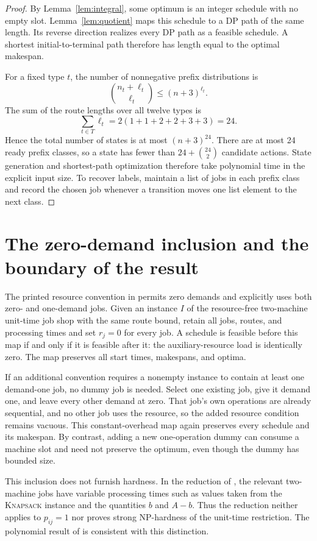 \documentclass[11pt]{article}
\begin{document}
\begin{proof}
By Lemma~\ref{lem:integral}, some optimum is an integer schedule with no
empty slot.  Lemma~\ref{lem:quotient} maps this schedule to a DP path of the
same length.  Its reverse direction realizes every DP path as a feasible
schedule.  A shortest initial-to-terminal path therefore has length equal to
the optimal makespan.

For a fixed type $t$, the number of nonnegative prefix distributions is
\[
 \binom{n_t+\ell_t}{\ell_t}
 \leq (n+3)^{\ell_t}.
\]
The sum of the route lengths over all twelve types is
\[
 \sum_{t\in T}\ell_t
 =2(1+1+2+2+3+3)=24.
\]
Hence the total number of states is at most $(n+3)^{24}$.  There are at most
24 ready prefix classes, so a state has fewer than
$24+\binom{24}{2}$ candidate actions.  State generation and shortest-path
optimization therefore take polynomial time in the explicit input size.
To recover labels, maintain a list of jobs in each prefix class and record the
chosen job whenever a transition moves one list element to the next class.
\end{proof}

\section{The zero-demand inclusion and the boundary of the result}

The printed resource convention in \cite{TellacheAzerine2026} permits zero
demands and explicitly uses both zero- and one-demand jobs.  Given an instance
$I$ of the resource-free two-machine unit-time job shop with the same route
bound, retain all jobs, routes, and processing times and set $r_j=0$ for every
job.  A schedule is feasible before this map if and only if it is feasible
after it: the auxiliary-resource load is identically zero.  The map preserves
all start times, makespans, and optima.

If an additional convention requires a nonempty instance to contain at least
one demand-one job, no dummy job is needed.  Select one existing job, give it
demand one, and leave every other demand at zero.  That job's own operations
are already sequential, and no other job uses the resource, so the added
resource condition remains vacuous.  This constant-overhead map again
preserves every schedule and its makespan.  By contrast, adding a new
one-operation dummy can consume a machine slot and need not preserve the
optimum, even though the dummy has bounded size.

This inclusion does not furnish hardness.  In the reduction of
\cite{LenstraRinnooyKanBrucker1977}, the relevant two-machine jobs have
variable processing times such as values taken from the \textsc{Knapsack}
instance and the quantities $b$ and $A-b$.  Thus the reduction neither
applies to $p_{ij}=1$ nor proves strong NP-hardness of the unit-time
restriction.  The polynomial result of \cite{HefetzAdiri1982} is consistent
with this distinction.
\end{document}
